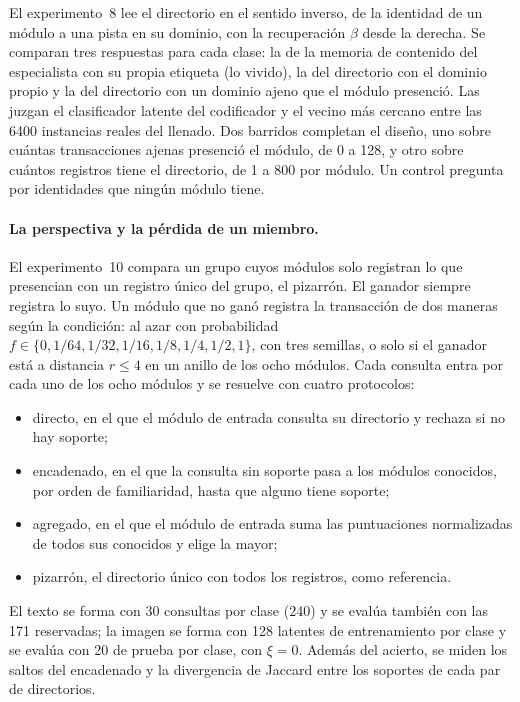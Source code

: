 El experimento~8 lee el directorio en el sentido inverso, de la identidad de un módulo a
una pista en su dominio, con la recuperación $\beta$ desde la derecha.
Se comparan tres respuestas para cada clase: la de la memoria de contenido del
especialista con su propia etiqueta (lo vivido), la del directorio con el dominio propio
y la del directorio con un dominio ajeno que el módulo presenció.
Las juzgan el clasificador latente del codificador y el vecino más cercano entre las
6400 instancias reales del llenado.
Dos barridos completan el diseño, uno sobre cuántas transacciones ajenas presenció el
módulo, de 0 a 128, y otro sobre cuántos registros tiene el directorio, de 1 a 800 por
módulo.
Un control pregunta por identidades que ningún módulo tiene.

\paragraph{La perspectiva y la pérdida de un miembro.}
El experimento~10 compara un grupo cuyos módulos solo registran lo que presencian con un
registro único del grupo, el pizarrón.
El ganador siempre registra lo suyo.
Un módulo que no ganó registra la transacción de dos maneras según la condición: al
azar con probabilidad $f \in \{0, 1/64, 1/32, 1/16, 1/8, 1/4, 1/2, 1\}$, con tres
semillas, o solo si el ganador está a distancia $r \le 4$ en un anillo de los ocho
módulos.
Cada consulta entra por cada uno de los ocho módulos y se resuelve con cuatro
protocolos:
\begin{itemize}
    \item directo, en el que el módulo de entrada consulta su directorio y rechaza si no
    hay soporte;
    \item encadenado, en el que la consulta sin soporte pasa a los módulos conocidos, por
    orden de familiaridad, hasta que alguno tiene soporte;
    \item agregado, en el que el módulo de entrada suma las puntuaciones normalizadas de
    todos sus conocidos y elige la mayor;
    \item pizarrón, el directorio único con todos los registros, como referencia.
\end{itemize}
El texto se forma con 30 consultas por clase (240) y se evalúa también con las 171
reservadas; la imagen se forma con 128 latentes de entrenamiento por clase y se evalúa
con 20 de prueba por clase, con $\xi = 0$.
Además del acierto, se miden los saltos del encadenado y la divergencia de Jaccard entre
los soportes de cada par de directorios.

